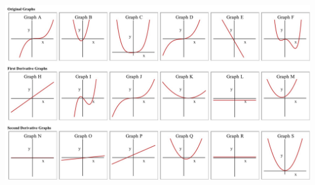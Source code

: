 \documentclass{ximera}
\begin{document}
\begin{image}
\centering
\includegraphics{matching}
\end{image}
\end{document}
